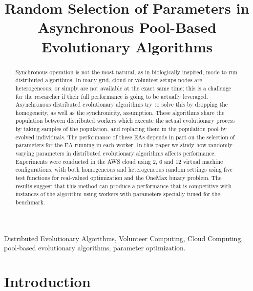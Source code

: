 \documentclass[conference]{IEEEtran}
\begin{document}
\title{Random Selection of Parameters in Asynchronous Pool-Based Evolutionary Algorithms}

\author{
  \and
}

\maketitle
\begin{abstract}
  Synchronous operation is not the most natural, as in biologically
  inspired, mode to run
distributed algorithms. In many grid, cloud or volunteer setups nodes
are heterogeneous, or simply are not available at the exact same time;
this is a challenge for the researcher if their full performance is
going to be actually leveraged. Asynchronous distributed evolutionary
algorithms try to solve this by dropping the homogeneity, as well as
the synchronicity, assumption. These algorithms share the population between distributed
workers which execute the actual evolutionary process by taking
samples of the population, and replacing them in the population pool
by evolved individuals. The performance of these EAs depends in part
on the selection of parameters for the EA running in each worker. In
this paper we study how randomly varying parameters in distributed
evolutionary algorithms affects performance. Experiments were
conducted in the AWS cloud using 2, 6 and 12 virtual machine
configurations, with both homogeneous and heterogeneous random
settings using five test functions for real-valued optimization and
the OneMax binary problem. The results suggest that this method can
produce a performance that is competitive with instances of the
algorithm using workers with parameters specially tuned for the
benchmark.
\end{abstract}


\begin{IEEEkeywords}
  Distributed Evolutionary Algorithms, Volunteer Computing,
  Cloud Computing, pool-based evolutionary algorithms, parameter optimization. 
\end{IEEEkeywords}

\section{Introduction}
\end{document}
